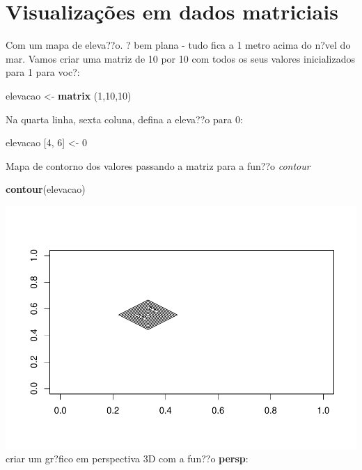 \documentclass[]{book}
\newenvironment{Shaded}{\begin{snugshade}}{\end{snugshade}}
\newcommand{\DecValTok}[1]{\textcolor[rgb]{0.00,0.00,0.81}{#1}}
\newcommand{\KeywordTok}[1]{\textcolor[rgb]{0.13,0.29,0.53}{\textbf{#1}}}
\newcommand{\NormalTok}[1]{#1}
\newcommand{\StringTok}[1]{\textcolor[rgb]{0.31,0.60,0.02}{#1}}
\begin{document}
\hypertarget{visualizacoes-em-dados-matriciais}{%
\section{Visualizações em dados matriciais}\label{visualizacoes-em-dados-matriciais}}

Com um mapa de eleva??o. ? bem plana - tudo fica a 1 metro acima do n?vel do mar. Vamos criar uma matriz de 10 por 10 com todos os seus valores inicializados para 1 para voc?:

\begin{Shaded}
\begin{Highlighting}[]
\NormalTok{elevacao <-}\StringTok{ }\KeywordTok{matrix}\NormalTok{ (}\DecValTok{1}\NormalTok{,}\DecValTok{10}\NormalTok{,}\DecValTok{10}\NormalTok{)}
\end{Highlighting}
\end{Shaded}

Na quarta linha, sexta coluna, defina a eleva??o para 0:

\begin{Shaded}
\begin{Highlighting}[]
\NormalTok{elevacao [}\DecValTok{4}\NormalTok{, }\DecValTok{6}\NormalTok{] <-}\StringTok{ }\DecValTok{0}
\end{Highlighting}
\end{Shaded}

Mapa de contorno dos valores passando a matriz para a fun??o \emph{contour}

\begin{Shaded}
\begin{Highlighting}[]
\KeywordTok{contour}\NormalTok{(elevacao)}
\end{Highlighting}
\end{Shaded}

\includegraphics{TudodoR_files/figure-latex/unnamed-chunk-71-1.pdf}
criar um gr?fico em perspectiva 3D com a fun??o \textbf{persp}:
\end{document}
